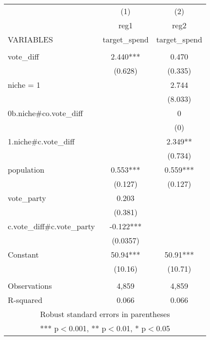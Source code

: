 \documentclass[]{article}
\begin{document}
\begin{tabular}{lcc} \hline
 & (1) & (2) \\
 & reg1 & reg2 \\
VARIABLES & target\_spend & target\_spend \\ \hline
 &  &  \\
vote\_diff & 2.440*** & 0.470 \\
 & (0.628) & (0.335) \\
niche = 1 &  & 2.744 \\
 &  & (8.033) \\
0b.niche\#co.vote\_diff &  & 0 \\
 &  & (0) \\
1.niche\#c.vote\_diff &  & 2.349** \\
 &  & (0.734) \\
population & 0.553*** & 0.559*** \\
 & (0.127) & (0.127) \\
vote\_party & 0.203 &  \\
 & (0.381) &  \\
c.vote\_diff\#c.vote\_party & -0.122*** &  \\
 & (0.0357) &  \\
Constant & 50.94*** & 50.91*** \\
 & (10.16) & (10.71) \\
 &  &  \\
Observations & 4,859 & 4,859 \\
 R-squared & 0.066 & 0.066 \\ \hline
\multicolumn{3}{c}{ Robust standard errors in parentheses} \\
\multicolumn{3}{c}{ *** p$<$0.001, ** p$<$0.01, * p$<$0.05} \\
\end{tabular}
\end{document}
